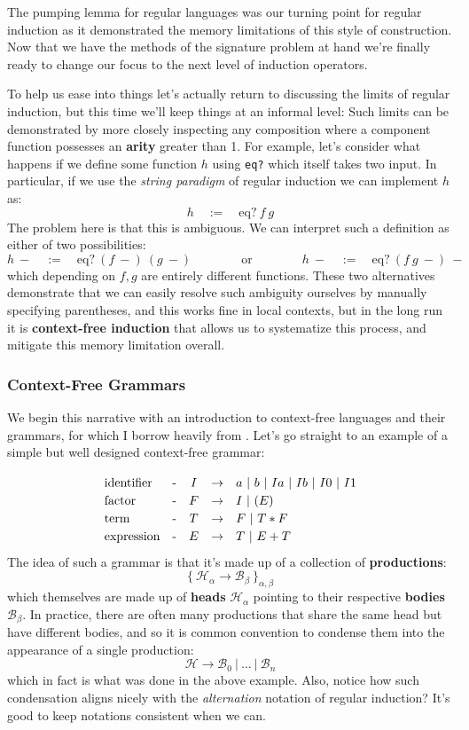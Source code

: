 \documentclass[twoside]{article}
\newcommand{\qdefeq}{\ensuremath{\quad :=\quad}}
\newcommand{\strong}[1]{{\bfseries #1}}
\newcommand{\twoqquad}{\ensuremath{\qquad\qquad}}
\newcommand{\eq}{\mbox{eq?}}
\begin{document}
The pumping lemma for regular languages was our turning point for regular induction as it demonstrated the memory
limitations of this style of construction. Now that we have the methods of the signature problem at hand we're
finally ready to change our focus to the next level of induction operators.

To help us ease into things let's actually return to discussing the limits of regular induction, but this time we'll
keep things at an informal level: Such limits can be demonstrated by more closely inspecting any composition where a
component function possesses an \strong{arity} greater than 1. For example, let's consider what happens if
we define some function $ h $ using \texttt{eq?} which itself takes two input. In particular,
if we use the \emph{string paradigm} of regular induction we can implement $ h $ as:
$$ h \qdefeq \eq\ f\ g $$
The problem here is that this is ambiguous. We can interpret such a definition as either of two possibilities:
$$ h\ - \qdefeq \eq\ (f\ -)\ (g\ -) \twoqquad \mbox{or} \twoqquad h\ - \qdefeq \eq\ (f\ g\ -)\ - $$
which depending on $ f, g $ are entirely different functions. These two alternatives demonstrate that we can easily resolve
such ambiguity ourselves by manually specifying parentheses, and this works fine in local contexts, but in the long run
it is \strong{context-free induction} that allows us to systematize this process, and mitigate this memory limitation overall.

\subsubsection*{Context-Free Grammars}

We begin this narrative with an introduction to context-free languages and their grammars, for which I borrow heavily
from \cite{iatlc}. Let's go straight to an example of a simple but well designed context-free grammar:

$$ \def\arraystretch{1.2}
\begin{array}{lcccl}
\mbox{identifier}	& \mbox{-} & I & \to & a\ |\ b\ |\ Ia\ |\ Ib\ |\ I0\ |\ I1		\\
\mbox{factor}		& \mbox{-} & F & \to & I\ |\ (E)					\\
\mbox{term}		& \mbox{-} & T & \to & F\ |\ T*F					\\
\mbox{expression}	& \mbox{-} & E & \to & T\ |\ E+T
\end{array} $$
The idea of such a grammar is that it's made up of a collection of \strong{productions}:
$$ \{\ \mathcal{H}_\alpha \to \mathcal{B}_\beta\ \}_{\alpha, \beta} $$
which themselves are made up of \strong{heads} $ \mathcal{H}_\alpha $ pointing to their respective \strong{bodies}
$ \mathcal{B}_\beta $. In practice, there are often many productions that share the same head but have different bodies,
and so it is common convention to condense them into the appearance of a single production:
$$ \mathcal{H} \to \mathcal{B}_0\ |\ \ldots\ |\ \mathcal{B}_n $$
which in fact is what was done in the above example. Also, notice how such condensation aligns nicely with
the \emph{alternation} notation of regular induction? It's good to keep notations consistent when we can.
\end{document}
